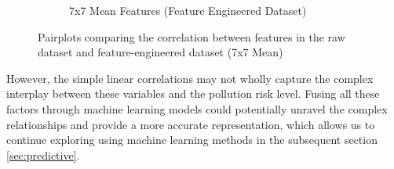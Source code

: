 \documentclass[a4paper,11pt]{report}
\newcommand{\qs}[1]{\textbf{\color{blue}#1}}
\begin{document}
\begin{figure}[H]
\begin{subfigure}[c]{0.45\textwidth}
    \caption{7x7 Mean Features (Feature Engineered Dataset)}
    \label{fig:15pair}
\end{subfigure}

\caption{Pairplots comparing the correlation between features in the raw dataset and feature-engineered dataset (7x7 Mean)}
\end{figure}


However, the simple linear correlations may not wholly capture the complex interplay between these variables and the pollution risk level. Fusing all these factors through machine learning models could potentially unravel the complex relationships and provide a more accurate representation, which allows us to continue exploring using machine learning methods in the subsequent section \ref{sec:predictive}.

\end{document}
